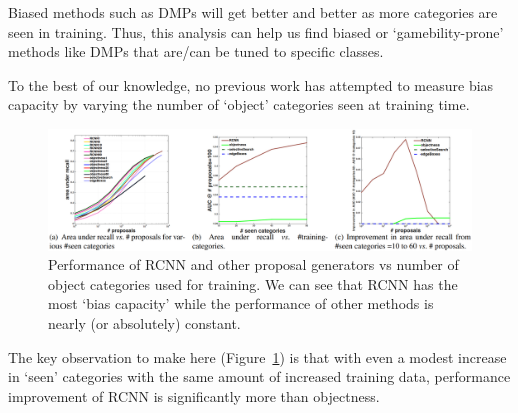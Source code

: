 \documentclass[10pt]{article}
\newcommand{\Fig}[1]{Figure~\ref{fig:#1}}
\begin{document}
Biased methods such as DMPs will get better and better as more categories are
seen in training. Thus, this analysis can help us find biased or
`gamebility-prone' methods like DMPs that are/can be tuned to specific classes.

To the best of our knowledge, no previous work has attempted to measure bias
capacity by varying the number of `object' categories seen at training time.

\setcounter{figure}{5}
\begin{figure}[htpb]
  \centering
  \includegraphics[width=0.9\linewidth]{fig_6.png}
  \caption{Performance of RCNN and other proposal generators vs number of
    object categories used for training. We can see that RCNN has the most
    `bias capacity' while the performance of other methods is nearly (or
    absolutely) constant.}%
  \label{fig:6}
\end{figure}

The key observation to make here (\Fig{6}) is that with even a modest
increase in `seen' categories with the same amount of increased training data,
performance improvement of RCNN is significantly more than objectness. 
\end{document}
